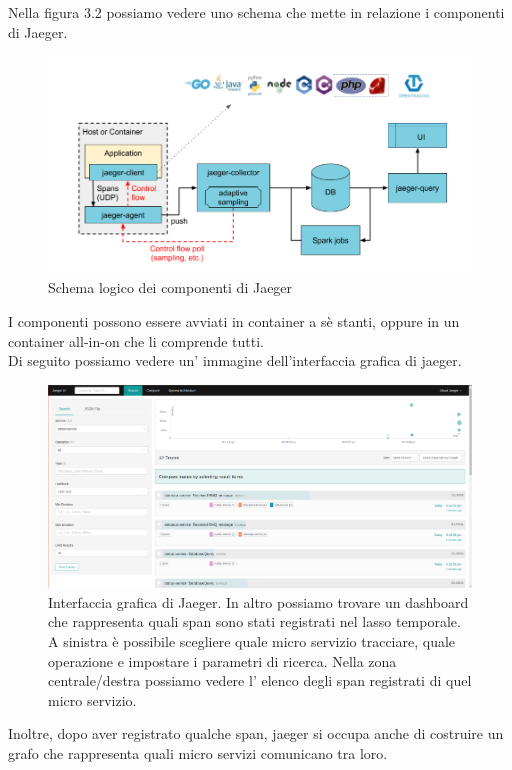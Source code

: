 \documentclass[a4paper,12pt,titlepage,italian,openany]{report}
\begin{document}
Nella figura 3.2 possiamo vedere uno schema che mette in relazione i componenti di Jaeger.
\begin{figure}[H]
    \includegraphics[scale=0.4]{32.png}
    \centering
    \caption{Schema logico dei componenti di Jaeger}
\end{figure}
I componenti possono essere avviati in container a sè stanti, oppure in un container all-in-on che li comprende tutti.\\
Di seguito possiamo vedere un' immagine dell'interfaccia grafica di jaeger.
\begin{figure}[H]
    \includegraphics[scale=0.21]{48.png}
    \centering
    \caption{Interfaccia grafica di Jaeger. In altro possiamo trovare un dashboard che rappresenta quali span sono stati registrati nel lasso temporale. A sinistra è possibile scegliere quale micro servizio tracciare, quale operazione e impostare i parametri di ricerca. Nella zona
    centrale/destra possiamo vedere l' elenco degli span registrati di quel micro servizio.}
    
\end{figure}

Inoltre, dopo aver registrato qualche span, jaeger si occupa anche di costruire un grafo che rappresenta quali micro servizi comunicano tra loro.
\end{document}
